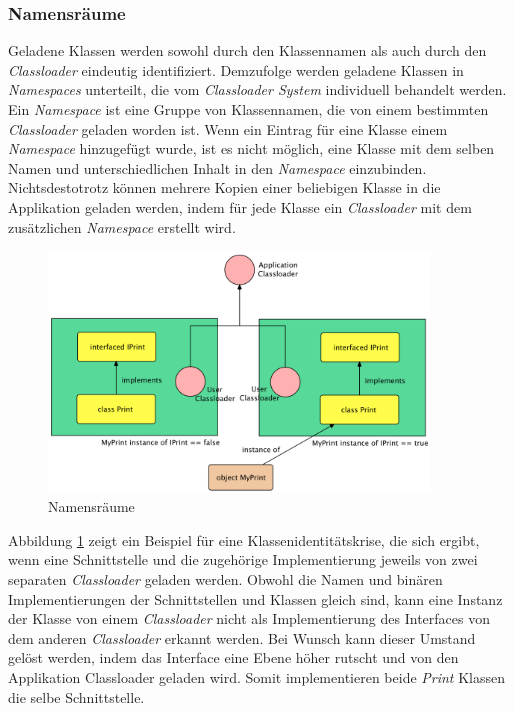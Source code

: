 \subsubsection{Namensräume}
Geladene Klassen werden sowohl durch den Klassennamen als auch durch den \textit{Classloader} eindeutig identifiziert. Demzufolge werden geladene Klassen in \textit{Namespaces} unterteilt, die vom \textit{Classloader System} individuell behandelt werden.
\newline
Ein \textit{Namespace} ist eine Gruppe von Klassennamen, die von einem bestimmten \textit{Classloader} geladen worden ist. Wenn ein Eintrag für eine Klasse einem \textit{Namespace} hinzugefügt wurde, ist es nicht möglich, eine Klasse mit dem selben Namen und unterschiedlichen Inhalt in den \textit{Namespace} einzubinden. Nichtsdestotrotz können mehrere Kopien einer beliebigen Klasse in die Applikation geladen werden, indem für jede Klasse ein \textit{Classloader} mit dem zusätzlichen \textit{Namespace} erstellt wird. 
\begin{figure}[h]
  \centering
  \includegraphics[width=0.9\textwidth]{material/images/namespaces.png}
  \caption{Namensräume}
  \label{fig:namespaces}
\end{figure}
\newline
Abbildung \ref{fig:namespaces} zeigt ein Beispiel für eine Klassenidentitätskrise, die sich ergibt, wenn eine Schnittstelle und die zugehörige Implementierung jeweils von zwei separaten \textit{Classloader} geladen werden. Obwohl die Namen und binären Implementierungen der Schnittstellen und Klassen gleich sind, kann eine Instanz der Klasse von einem \textit{Classloader} nicht als Implementierung des Interfaces von dem anderen \textit{Classloader} erkannt werden. \newline 
Bei Wunsch kann dieser Umstand gelöst werden, indem das Interface eine Ebene höher rutscht und von den Applikation Classloader geladen wird. Somit implementieren beide \textit{Print} Klassen die selbe Schnittstelle.   
